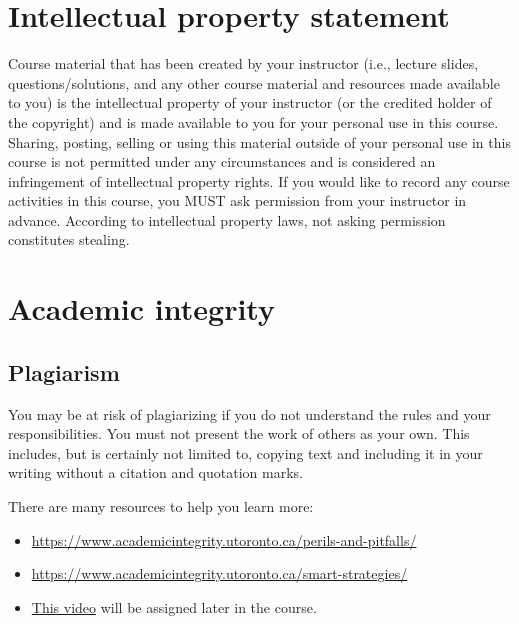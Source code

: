 \documentclass[
  openany]{book}
\begin{document}
\hypertarget{intellectual-property-statement-1}{%
\section{Intellectual property statement}\label{intellectual-property-statement-1}}

Course material that has been created by your instructor (i.e., lecture slides, questions/solutions, and any other course material and resources made available to you) is the intellectual property of your instructor (or the credited holder of the copyright) and is made available to you for your personal use in this course. Sharing, posting, selling or using this material outside of your personal use in this course is not permitted under any circumstances and is considered an infringement of intellectual property rights. If you would like to record any course activities in this course, you MUST ask permission from your instructor in advance. According to intellectual property laws, not asking permission constitutes stealing.

\hypertarget{academic-integrity}{%
\section{Academic integrity}\label{academic-integrity}}

\hypertarget{plagiarism}{%
\subsection{Plagiarism}\label{plagiarism}}

You may be at risk of plagiarizing if you do not understand the rules and your responsibilities. You must not present the work of others as your own. This includes, but is certainly not limited to, copying text and including it in your writing without a citation and quotation marks.

There are many resources to help you learn more:

\begin{itemize}
\item
  \url{https://www.academicintegrity.utoronto.ca/perils-and-pitfalls/}
\item
  \url{https://www.academicintegrity.utoronto.ca/smart-strategies/}
\item
  \href{https://web.microsoftstream.com/video/496ed3f7-4136-420f-9108-b5f3605bc899}{This video} will be assigned later in the course.
\end{itemize}
\end{document}
